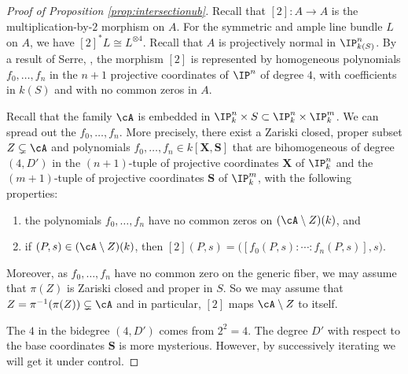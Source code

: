 \begin{proof}[Proof of Proposition \ref{prop:intersectionub}] Recall that $[2] \colon
A \rightarrow A$  is the  multiplication-by-$2$ morphism on $A$. For the symmetric and ample line bundle
$L$ on $A$, we have $[2]^*L \cong L^{\otimes 4}$.
Recall that $A$ is projectively normal in $\IP_{k(S)}^n$.
By a result of Serre, \cite[Corollaire~2, Appendix~II]{Ast6970},
the morphism $[2]$ is represented
 by homogeneous
polynomials $f_0,\ldots,f_n$ in the $n+1$ projective coordinates of $\IP^n$ of degree $4$, with  coefficients in $k(S)$ and with no common
zeros in $A$.

Recall that the family $\cA$ is embedded in
$\IP_k^n\times S \subset\IP_k^n\times\IP_k^m$. We can spread out the
$f_0,\ldots,f_n$. More precisely, there exist a Zariski closed, proper
subset $Z\subsetneq \cA$ and polynomials $f_0,\ldots,f_n \in
k[\mathbf{X},\mathbf{S}]$ that are bihomogeneous of degree $(4,D')$ in
 the $(n+1)$-tuple of projective coordinates $\mathbf{X}$ of
$\IP_k^n$
and the $(m+1)$-tuple of projective coordinates $\mathbf{S}$ of
$\IP_k^m$,
 with the following properties:
\begin{enumerate}
 \item [(i)] the polynomials $f_0,\ldots,f_n$ have no common zeros on
 $(\cA\setminus Z)(k)$, and
 \item[(ii)]  if   $(P,s)\in(\cA\setminus Z)(k)$, then $[2](P,s) = \bigl([f_0(P,s):\cdots : f_n(P,s)],s\bigr)$.
\end{enumerate}
Moreover, as $f_0,\ldots,f_n$ have no common zero on the generic
fiber, we may assume that $\pi(Z)$ is Zariski closed and proper in
$S$. So we may assume that $Z = \pi^{-1}(\pi(Z))\subsetneq \cA$ and in particular,
$[2]$ maps $\cA\setminus Z$ to itself.

The  $4$ in the bidegree $(4,D')$ comes from $2^2=4$. The degree
$D'$ with respect to the base coordinates $\mathbf{S}$ is more mysterious. However,
by successively iterating we will get it under control.



\end{proof}
